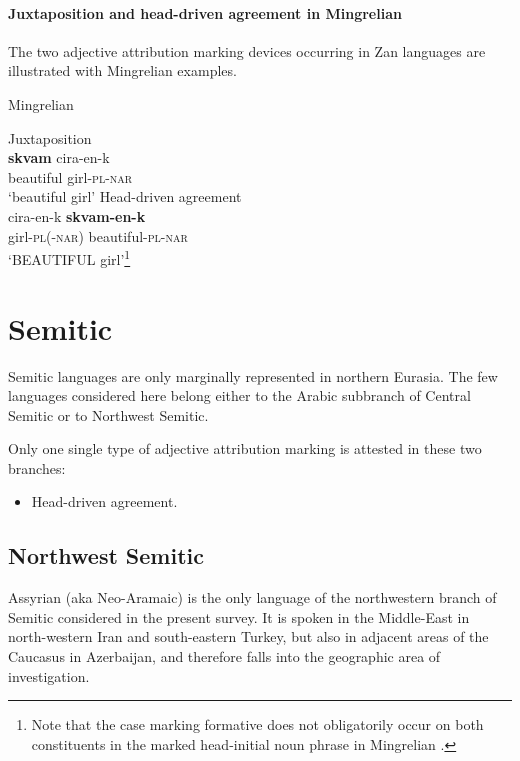 \paragraph*{Juxtaposition and head\hyp{}driven agreement in Mingrelian}
The two adjective attribution marking devices occurring in Zan languages are illustrated with Mingrelian examples.
\begin{exe}
\ex \rm{Mingrelian \citep[361–364]{harris1991b}}
\begin{xlist}
\label{mingrelian juxt}
\ex \rm{Juxtaposition}\\
\gll	\textbf{skvam} cira-en-k\\
	beautiful girl-\textsc{pl}-\textsc{nar}\\
\glt	‘beautiful girl’%
\label{mingrelian agr}
\ex \rm{Head\hyp{}driven agreement}\\
\gll	cira-en-k \textbf{skvam-en-k}\\
	girl-\textsc{pl}(-\textsc{nar}) beautiful-\textsc{pl}-\textsc{nar}\\
\glt	‘BEAUTIFUL girl’\footnote{Note that the case marking formative does not obligatorily occur on both constituents in the marked head-initial noun phrase in Mingrelian \citep[363–364]{harris1991b}.}%
\end{xlist}
\end{exe}

\section{Semitic}
Semitic languages are only marginally represented in northern Eurasia. The few languages considered here belong either to the Arabic subbranch of Central Semitic or to Northwest Semitic.

Only one single type of adjective attribution marking is attested in these two branches:
\begin{itemize}
\item Head\hyp{}driven agreement.
\end{itemize}

\subsection{Northwest Semitic}
Assyrian (aka Neo-Aramaic) is the only language of the northwestern branch of Semitic considered in the present survey. It is spoken in the Middle-East in north-western Iran and south-eastern Turkey, but also in adjacent areas of the Caucasus in Azerbaijan, and therefore falls into the geographic area of investigation.


